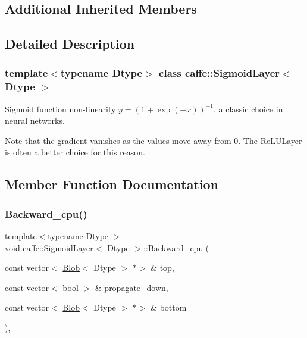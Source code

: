 \subsection*{Additional Inherited Members}


\subsection{Detailed Description}
\subsubsection*{template$<$typename Dtype$>$\newline
class caffe\+::\+Sigmoid\+Layer$<$ Dtype $>$}

Sigmoid function non-\/linearity $ y = (1 + \exp(-x))^{-1} $, a classic choice in neural networks. 

Note that the gradient vanishes as the values move away from 0. The \mbox{\hyperlink{classcaffe_1_1_re_l_u_layer}{Re\+L\+U\+Layer}} is often a better choice for this reason. 

\subsection{Member Function Documentation}
\mbox{\label{classcaffe_1_1_sigmoid_layer_a14561ff9802e8d8bf8f148c18a91d73e}} 
\subsubsection{\texorpdfstring{Backward\+\_\+cpu()}{Backward\_cpu()}\hspace{0.1cm}{\footnotesize\ttfamily [1/2]}}
{\footnotesize\ttfamily template$<$typename Dtype $>$ \\
void \mbox{\hyperlink{classcaffe_1_1_sigmoid_layer}{caffe\+::\+Sigmoid\+Layer}}$<$ Dtype $>$\+::Backward\+\_\+cpu (\begin{DoxyParamCaption}\item[{const vector$<$ \mbox{\hyperlink{classcaffe_1_1_blob}{Blob}}$<$ Dtype $>$ $\ast$$>$ \&}]{top,  }\item[{const vector$<$ bool $>$ \&}]{propagate\+\_\+down,  }\item[{const vector$<$ \mbox{\hyperlink{classcaffe_1_1_blob}{Blob}}$<$ Dtype $>$ $\ast$$>$ \&}]{bottom }\end{DoxyParamCaption})\hspace{0.3cm}{\ttfamily [protected]}, {\ttfamily [virtual]}}




